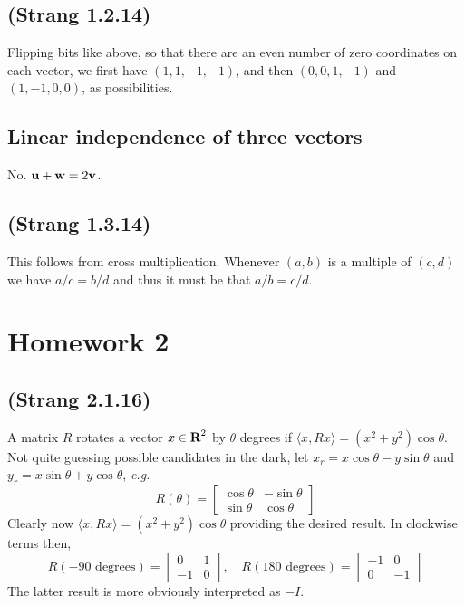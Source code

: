 \documentclass[10pt]{article}
\newcommand{\reals}{{\mbox{\bf R}}}
\newcommand{\eg}{{\it e.g.}}
\begin{document}
\subsection{(Strang 1.2.14)}
Flipping bits like above, so that there are an even number of zero coordinates on each vector, we first have $(1, 1, -1, -1)$, and then $(0, 0, 1, -1)$ and $(1, -1, 0, 0)$, as possibilities. 

\subsection{Linear independence of three vectors}
No. ${\bf u} + {\bf w} = 2{\bf v}$.

\subsection{(Strang 1.3.14)}
This follows from cross multiplication. Whenever $(a, b)$ is a multiple of $(c, d)$ we have $a/c = b/d$ and thus it must be that $a/b = c/d$. 

\section{Homework 2}
\subsection{(Strang 2.1.16)}
A matrix $R$ rotates a vector $x\in \reals^2$ by $\theta$ degrees if $\langle x, Rx \rangle = (x^2 + y^2)\cos{\theta}$. Not quite guessing possible candidates in the dark, let $x_r = x\cos{\theta} - y\sin{\theta}$ and $y_r = x\sin{\theta} + y\cos{\theta}$, \eg 
\[R(\theta) = 
\begin{bmatrix}
	\cos{\theta} & -\sin{\theta} \\
	\sin{\theta} & \cos{\theta}	
\end{bmatrix}
\]
Clearly now $\langle x, Rx \rangle = (x^2 + y^2)\cos{\theta}$ providing the desired result. In clockwise terms then,
\[R(-90\text{ degrees}) = 
\begin{bmatrix}
	0 & 1 \\
	-1 & 0	
\end{bmatrix},\quad 
R(180\text{ degrees}) = 
\begin{bmatrix}
	-1 & 0 \\
	0 & -1	
\end{bmatrix}
\]
The latter result is more obviously interpreted as $-I$.
\end{document}
